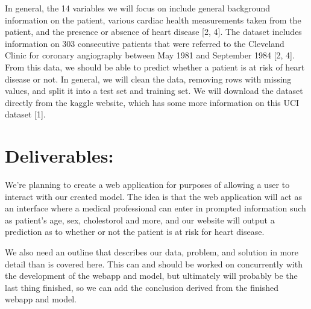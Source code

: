 \documentclass[12pt]{article}
\begin{document}
In general, the 14 variables we will focus on include general background 
information on the patient, various cardiac health measurements taken from 
the patient, and the presence or absence of heart disease [2, 4]. 
The dataset includes information on 303 consecutive patients that were 
referred to the Cleveland Clinic for coronary angiography between May 1981 
and September 1984 [2, 4]. From this data, we should be able to predict 
whether a patient is at risk of heart disease or not. In general, we will 
clean the data, removing rows with missing values, and split it into a test 
set and training set. We will download the dataset directly from the kaggle 
website, which has some more information on this UCI dataset [1].

\section*{Deliverables: }

We’re planning to create a web application for purposes of allowing a user 
to interact with our created model. The idea is that the web application 
will act as an interface where a medical professional can enter in prompted 
information such as patient’s age, sex, cholestorol and more, and our 
website will output a prediction as to whether or not the patient is at risk 
for heart disease.

We also need an outline that describes our data, problem, and solution 
in more detail than is covered here. This can and should be worked on 
concurrently with the development of the webapp and model, but ultimately 
will probably be the last thing finished, so we can add the conclusion 
derived from the finished webapp and model.
\end{document}
